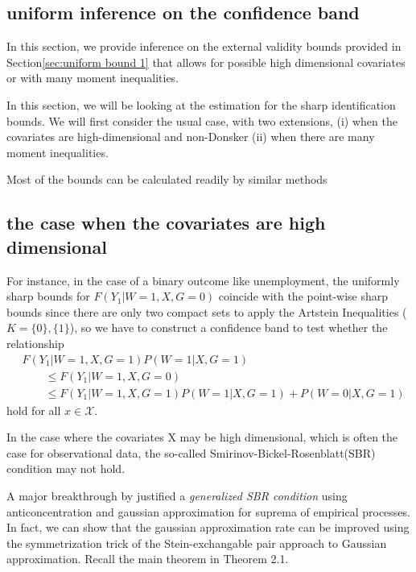 \documentclass{article}
\begin{document}
\subsection{ uniform inference on the confidence band }

In this section, we provide inference on the external validity bounds provided in Section\ref{sec:uniform bound 1} that allows for possible high dimensional covariates or with many moment inequalities.  






In this section, we will be looking at the estimation for the sharp identification bounds. We will first consider the usual case, with two extensions, (i) when the covariates are high-dimensional and non-Donsker (ii) when there are many moment inequalities.

Most of the bounds can be calculated readily by similar methods

\subsection{the case when the covariates are high dimensional}

For instance, in the case of a binary outcome like unemployment, the uniformly sharp bounds for $F(Y_1| W=1, X, G=0)$ coincide with the point-wise sharp bounds since there are only two compact sets to apply the Artstein Inequalities ($K=\{0\}, \{1\}$), so we have to construct a confidence band to test whether 
the relationship
\begin{align}
    &F(Y_1 | W=1,X,G=1) P(W=1| X, G=1) \\
    &\hspace{2em}\leq F(Y_1| W=1, X, G=0) \\ 
    &\hspace{2em}\leq F(Y_1 | W=1,X,G=1) P(W=1 | X, G=1) + P(W=0 | X, G=1)
\end{align}
hold for all $ x \in \mathcal{X}$. 

In the case where the covariates X may be high dimensional, which is often the case for observational data, the so-called Smirinov-Bickel-Rosenblatt(SBR) condition may not hold.


A major breakthrough by \cite{chernozhukov2014anti} justified a \textit{generalized SBR condition} using anticoncentration and gaussian approximation for 
suprema of empirical processes. In fact, we can show that the gaussian approximation rate can be improved using the symmetrization trick of the Stein-exchangable pair approach to Gaussian approximation. Recall the main theorem in \cite{cite chern suprema} Theorem 2.1.
\end{document}
